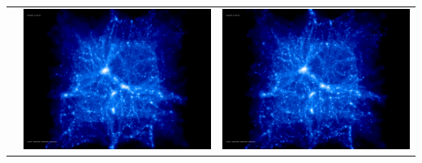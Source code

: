 \documentclass[a4paper,11pt,fleqn,oneside]{book}
\begin{document}
\begin{itemize}
\begin{table}[p]
\begin{tabular}{l|c|c}
 & \includegraphics[scale=0.075]{r256/h70/red_st14_log2/197.jpg} & \includegraphics[scale=0.075]{r256/h100/red_st14_log2/197.jpg} \\

\end{tabular}
\end{table}
\end{itemize}
\end{document}

